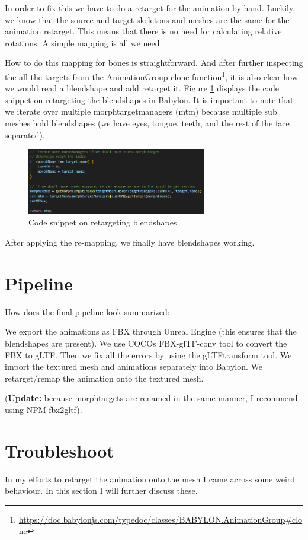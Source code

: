 \documentclass{uva-inf-article}
\begin{document}
In order to fix this we have to do a retarget for the animation by hand. Luckily, we know that the source and target skeletons and meshes are the same for the animation retarget. This means that there is no need for calculating relative rotations. A simple mapping is all we need.

How to do this mapping for bones is straightforward\cite{babForum}. And after further inspecting the all the targets from the AnimationGroup clone function\footnote{\url{https://doc.babylonjs.com/typedoc/classes/BABYLON.AnimationGroup\#clone}}, it is also clear how we would read a blendshape and add retarget it.
Figure \ref{fig:mtm} displays the code snippet on retargeting the blendshapes in Babylon. It is important to note that we iterate over multiple morphtargetmanagers (mtm) because multiple sub meshes hold blendshapes (we have eyes, tongue, teeth, and the rest of the face separated).

\begin{figure}[hbt!]
    \centering
    \includegraphics[width=0.7\textwidth]{imgs/mtm.png}
    \caption{Code snippet on retargeting blendshapes}
    \label{fig:mtm}
\end{figure}

After applying the re-mapping, we finally have blendshapes working.

\section{Pipeline}
How does the final pipeline look summarized:
\begin{center}
We export the animations as FBX through Unreal Engine (this ensures that the blendshapes are present). We use COCOs FBX-glTF-conv tool to convert the FBX to gLTF. Then we fix all the errors by using the gLTFtransform tool. We import the textured mesh and animations separately into Babylon. We retarget/remap the animation onto the textured mesh.
\end{center}
(\textbf{Update:} because morphtargets are renamed in the same manner, I recommend using NPM fbx2gltf).

\section{Troubleshoot}
In my efforts to retarget the animation onto the mesh I came across some weird behaviour. In this section I will further discuss these.
\end{document}
